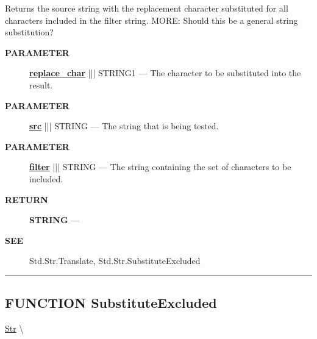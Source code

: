 \par





Returns the source string with the replacement character substituted for all characters included in the filter string. MORE: Should this be a general string substitution?






\par
\begin{description}
\item [\colorbox{tagtype}{\color{white} \textbf{\textsf{PARAMETER}}}] \textbf{\underline{replace\_char}} ||| STRING1 --- The character to be substituted into the result.
\item [\colorbox{tagtype}{\color{white} \textbf{\textsf{PARAMETER}}}] \textbf{\underline{src}} ||| STRING --- The string that is being tested.
\item [\colorbox{tagtype}{\color{white} \textbf{\textsf{PARAMETER}}}] \textbf{\underline{filter}} ||| STRING --- The string containing the set of characters to be included.
\end{description}







\par
\begin{description}
\item [\colorbox{tagtype}{\color{white} \textbf{\textsf{RETURN}}}] \textbf{STRING} --- 
\end{description}






\par
\begin{description}
\item [\colorbox{tagtype}{\color{white} \textbf{\textsf{SEE}}}] Std.Str.Translate, Std.Str.SubstituteExcluded
\end{description}




\rule{\linewidth}{0.5pt}
\subsection*{\textsf{\colorbox{headtoc}{\color{white} FUNCTION}
SubstituteExcluded}}

\hypertarget{ecldoc:str.substituteexcluded}{}
\hspace{0pt} \hyperlink{ecldoc:Str}{Str} \textbackslash 

